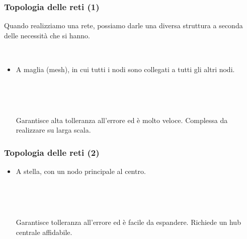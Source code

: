 \documentclass[]{beamer}
\begin{document}
\begin{frame}
\frametitle{Topologia delle reti (1)}
Quando realizziamo una rete, possiamo darle una diversa struttura a seconda delle necessità che si hanno.\pause

~

\begin{itemize}
  \item A \alert<2->{maglia} (mesh), in cui tutti i nodi sono collegati a tutti gli altri nodi.
  
  ~

  \pause 

  ~

  Garantisce alta tolleranza all'errore ed è molto veloce. Complessa da realizzare su larga scala.
\end{itemize}
\end{frame}

\begin{frame}
\frametitle{Topologia delle reti (2)}
  \begin{itemize}
    \item A \alert<1->{stella}, con un nodo principale al centro.
    
    ~

    \pause 

    ~

    Garantisce tolleranza all'errore ed è facile da espandere. Richiede un hub centrale affidabile.
  \end{itemize}
\end{frame}
\end{document}
